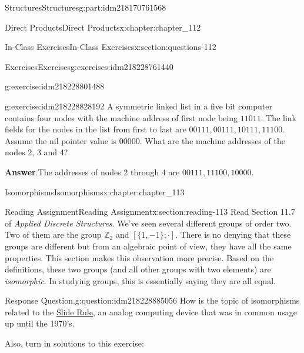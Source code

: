 \documentclass[oneside,10pt,]{book}
\newcommand{\blocktitlefont}{\relax}
\numberwithin{equation}{section}
\begin{document}
\begin{partptx}{Structures}{}{Structures}{}{}{g:part:idm218170761568}
\begin{chapterptx}{Direct Products}{}{Direct Products}{}{}{x:chapter:chapter_112}
\begin{sectionptx}{In-Class Exercises}{}{In-Class Exercises}{}{}{x:section:questions-112}
\begin{exercises-subsection-numberless}{Exercises}{}{Exercises}{}{}{g:exercises:idm218228761440}
\begin{exercisegroup}
\begin{divisionexerciseeg}{3}{}{}{g:exercise:idm218228801488}
\end{divisionexerciseeg}%
\begin{divisionexerciseeg}{4}{}{}{g:exercise:idm218228828192}%
A symmetric linked list in a five bit computer contains four nodes with the machine address of first node being \(11011\).  The link fields for the nodes in the list from first to last are \(00111, 00111, 10111, 11100\). Assume the nil pointer value is 00000.  What are the machine addresses of the nodes 2, 3 and 4?%
\par\smallskip%
\noindent\textbf{\blocktitlefont Answer}.\hypertarget{g:answer:idm218228850960}{}\quad{}The addresses of nodes 2 through 4 are \(00111, 11100, 10000\).%
\end{divisionexerciseeg}%
\end{exercisegroup}
\par\medskip\noindent
\end{exercises-subsection-numberless}
\end{sectionptx}
\end{chapterptx}
%
\typeout{************************************************}
\typeout{************************************************}
%
\begin{chapterptx}{Isomorphisms}{}{Isomorphisms}{}{}{x:chapter:chapter_113}
%
%
%
\typeout{************************************************}
\typeout{************************************************}
%
\begin{sectionptx}{Reading Assignment}{}{Reading Assignment}{}{}{x:section:reading-113}
Read Section 11.7  of \emph{Applied Discrete Structures}.  We've seen several different groups of order two. Two of them are the group \(\mathbb{Z}_2\) and \([\{1,-1\}; \cdot]\).  There is no denying that these groups are different but from an algebraic point of view, they have all the same properties.   This section makes this observation more precise.  Based on the definitions, these two groups (and all other groups with two elements) are \emph{isomorphic}.  In studying groups, this is essentially saying they are all equal.%
\begin{question}{Response Question.}{g:question:idm218228885056}%
How is the topic of isomorphisms related to the \hyperref[x:figure:fig-slide-rule]{Slide Rule}, an analog computing device that was in common usage up until the 1970's.%
\end{question}
Also, turn in solutions to this exercise:%
%
%
\typeout{************************************************}

\end{sectionptx}
\end{chapterptx}
\end{partptx}
\end{document}
